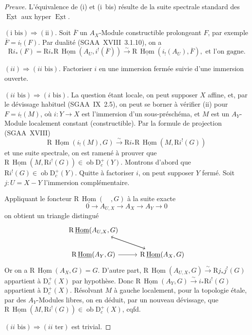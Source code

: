 \documentclass[11pt]{article}
\DeclareMathOperator{\Hom}{Hom}
\DeclareMathOperator{\Ext}{Ext}
\newcommand{\R}{\mathrm{R}}
\newcommand{\D}{\mathrm{D}}
\newcommand{\ob}{\operatorname{ob}}
\newcommand{\ol}[1]{\overline{#1}}
\providecommand{\Hom}{\operatorname{Hom}}
\providecommand{\ob}{\operatorname{ob}}
\providecommand{\R}{\mathrm R}
\begin{document}
\begin{proof}[Preuve]
L'équivalence de (i) et (i~bis) résulte de la suite spectrale standard des $\underline{\Ext}$ aux hyper $\underline{\Ext}$.

$(\text{i~bis}) \Rightarrow (\text{ii})$. Soit $\ol{F}$ un $A_X$-Module constructible prolongeant $F$, par exemple $\ol{F} = i_{!}(F)$. Par dualité (SGAA~XVIII~3.1.10), on a
\[
\R i_{*}(F) = \R i_{*} \R\,\underline{\Hom}(A_U, i^{!}(\ol{F})) \xrightarrow{\sim} \R\,\underline{\Hom}(i_{!}(A_U), \ol{F}), \text{ et l'on gagne.}
\]

$(ii) \Rightarrow (ii\text{~bis})$. Factoriser $i$ en une immersion fermée suivie d'une immersion ouverte.

$(ii\text{~bis}) \Rightarrow (i\text{~bis})$. La question étant locale, on peut supposer $X$ affine, et, par le dévissage habituel (SGAA~IX~2.5), on peut se borner à vérifier (ii) pour $F = i_{!}(M)$, où $i : Y \to X$ est l'immersion d'un sous-préschéma, et $M$ est un $A_Y$-Module localement constant (constructible). Par la formule de projection (SGAA~XVIII)
\[
\R\,\underline{\Hom}(i_{!}(M), G) \xrightarrow{\sim} \R i_{*} \R\,\underline{\Hom}(M, \R i^{!}(G))
\]
et une suite spectrale, on est ramené à prouver que $\R\,\underline{\Hom}(M, \R i^{!}(G)) \in \ob \D_c^{+}(Y)$. Montrons d'abord que $\R i^{!}(G) \in \ob \D_c^{+}(Y)$. Quitte à factoriser $i$, on peut supposer $Y$ fermé. Soit $j : U = X - Y$ l'immersion complémentaire.

Appliquant le foncteur $\R\,\underline{\Hom}(\quad, G)$ à la suite exacte
\[
0 \longrightarrow A_{U,X} \longrightarrow A_X \longrightarrow A_Y \longrightarrow 0
\]
on obtient un triangle distingué
\[
\begin{tikzcd}
\R\,\underline{\Hom}(A_{U,X}, G) \ar[dr] & \\
\R\,\underline{\Hom}(A_Y, G) \ar[r] & \R\,\underline{\Hom}(A_X, G) \ar[ul]
\end{tikzcd}
\]
Or on a $\R\,\underline{\Hom}(A_X, G) = G$. D'autre part, $\R\,\underline{\Hom}(A_{U,X}, G) \xrightarrow{\sim} \R j_{*} j^{!}(G)$ appartient à $\D_c^{+}(X)$ par hypothèse. Donc $\R\,\underline{\Hom}(A_Y, G) \xrightarrow{\sim} i_{*} \R i^{!}(G)$ appartient à $\D_c^{+}(X)$. Résolvant $M$ à gauche localement, pour la topologie étale, par des $A_Y$-Modules libres, on en déduit, par un nouveau dévissage, que $\R\,\underline{\Hom}(M, \R i^{!}(G)) \in \ob \D_c^{+}(X)$, cqfd.

$(ii\text{~bis}) \Rightarrow (ii\text{~ter})$ est trivial.


\end{proof}
\end{document}
